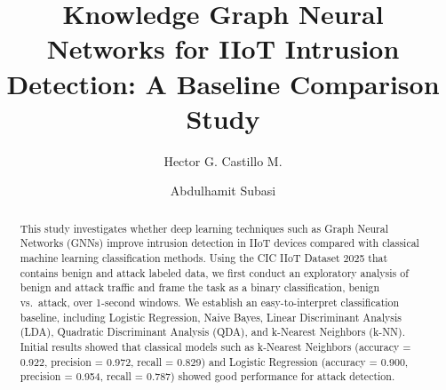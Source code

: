 \documentclass[final,5p,times,twocolumn]{elsarticle}
\begin{document}
\begin{frontmatter}




\title{Knowledge Graph Neural Networks for IIoT Intrusion Detection: A Baseline Comparison Study}

\author[label1]{Hector G. Castillo M.}

\author[label1]{Abdulhamit Subasi}





\address[label1]{College of Emergency Preparedness, Homeland Security and Cybersecurity, University at Albany, SUNY, Albany, NY, USA}

\begin{abstract}
This study investigates whether deep learning techniques such as Graph Neural Networks (GNNs) improve intrusion detection in IIoT devices compared with classical machine learning classification methods. Using the CIC IIoT Dataset 2025 that contains benign and attack labeled data, we first conduct an exploratory analysis of benign and attack traffic and frame the task as a binary classification, benign vs.\ attack, over 1-second windows. We establish an easy-to-interpret classification baseline, including Logistic Regression, Naive Bayes, Linear Discriminant Analysis (LDA), Quadratic Discriminant Analysis (QDA), and k-Nearest Neighbors (k-NN). Initial results showed that classical models such as k-Nearest Neighbors (accuracy = 0.922, precision = 0.972, recall = 0.829) and Logistic Regression (accuracy = 0.900, precision = 0.954, recall = 0.787) showed good performance for attack detection.


\end{abstract}
\end{frontmatter}
\end{document}
